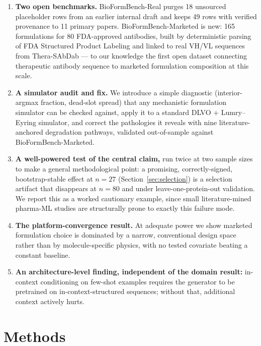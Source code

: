 \documentclass[twocolumn,10pt]{article}
\begin{document}
\begin{enumerate}\itemsep2pt
  \item \textbf{Two open benchmarks.} BioFormBench-Real purges 18 unsourced
        placeholder rows from an earlier internal draft and keeps 49 rows with
        verified provenance to 11 primary papers. BioFormBench-Marketed is new:
        165 formulations for 80 FDA-approved antibodies, built by deterministic
        parsing of FDA Structured Product Labeling and linked to real VH/VL
        sequences from Thera-SAbDab --- to our knowledge the first open dataset
        connecting therapeutic antibody sequence to marketed formulation
        composition at this scale.
  \item \textbf{A simulator audit and fix.} We introduce a simple diagnostic
        (interior-argmax fraction, dead-slot spread) that any mechanistic
        formulation simulator can be checked against, apply it to a standard
        DLVO $+$ Lumry--Eyring simulator, and correct the pathologies it reveals
        with nine literature-anchored degradation pathways, validated
        out-of-sample against BioFormBench-Marketed.
  \item \textbf{A well-powered test of the central claim,} run twice at two
        sample sizes to make a general methodological point: a promising,
        correctly-signed, bootstrap-stable effect at $n=27$
        (Section~\ref{sec:selection}) is a selection artifact that disappears at
        $n=80$ and under leave-one-protein-out validation. We report this as a
        worked cautionary example, since small literature-mined pharma-ML
        studies are structurally prone to exactly this failure mode.
  \item \textbf{The platform-convergence result.} At adequate power we show
        marketed formulation choice is dominated by a narrow, conventional
        design space rather than by molecule-specific physics, with no tested
        covariate beating a constant baseline.
  \item \textbf{An architecture-level finding, independent of the domain result:}
        in-context conditioning on few-shot examples requires the generator to be
        pretrained on in-context-structured sequences; without that, additional
        context actively hurts.
\end{enumerate}

\section{Methods}
\end{document}

